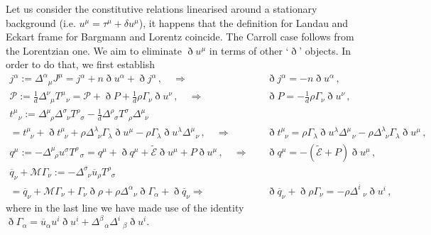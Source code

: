 \documentclass[superscriptaddress,prd,nofootinbib,preprintnumbers,longbibliography,11pt,eqsecnum]{revtex4-1}
\begin{document}
\begin{appendix}
Let us consider the constitutive relations linearised around a stationary background (i.e. $u^{\mu}=\tau^{\mu}+\delta u^{\mu}$), it happens that the definition for Landau and Eckart frame for Bargmann and Lorentz coincide. The Carroll case follows from the Lorentzian one. We aim to eliminate $\eth u^{\mu}$ in terms of other `$\eth$' objects. In order to do that, we first establish
\begin{equation}\begin{aligned}
	j^{\alpha}
	:=
	\Delta^{\alpha}_{\;\;\,\mu}J^{\mu}
	=
	j^{\alpha}
	+
	n\eth u^{\alpha}
	+
	\eth j^{\alpha}
	\,,
	\quad
	\Rightarrow
	&
	\quad
	\eth j^{\alpha}
	=
	-n\eth u^{\alpha}
	\,,
\\
	\mathcal{P}
	:=
	\frac{1}{d}
	\Delta^{\nu}_{\;\;\mu}T^{\mu}_{\;\;\,\nu}
	=
	\mathcal{P}
	+
	\eth P
	+
	\frac{1}{d}\rho \Gamma_{\nu}\eth u^{\nu}
	\,,
	\quad
	\Rightarrow
	&
	\quad
	\eth P
	=
	-\frac{1}{d}\rho \Gamma_{\nu}\eth u^{\nu}
	\,,
\\
	t^{\mu}_{\;\;\,\nu}
	:=
	\Delta^{\mu}_{\;\;\rho}\Delta^{\sigma}_{\;\;\nu}T^{\rho}_{\;\;\sigma}
	-
	\frac{1}{d}\Delta^{\rho}_{\;\;\sigma}T^{\sigma}_{\;\;\rho}\Delta^{\mu}_{\;\;\nu}
	\qquad\qquad\qquad\quad\;\;\;
	&
	\\
	=
	t^{\mu}_{\;\;\nu}
	+
	\eth t^{\mu}_{\;\;\nu}
	+
	\rho \Delta^{\lambda}_{\;\;\nu}\Gamma_{\lambda}\eth u^{\mu}
	-
	\rho \Gamma_{\lambda}\eth u^{\lambda}\Delta^{\mu}_{\;\;\,\nu}
	\,,
	\quad
	\Rightarrow
	&
	\quad
	\eth t^{\mu}_{\;\;\nu}
	=
	\rho \Gamma_{\lambda}\eth u^{\lambda}\Delta^{\mu}_{\;\;\,\nu}
	-
	\rho \Delta^{\lambda}_{\;\;\nu}\Gamma_{\lambda}\eth u^{\mu}
	\,,
\\
	q^{\mu}
	:=
	-
	\Delta^{\mu}_{\;\;\rho}u^{\sigma}T^{\rho}_{\;\;\,\sigma}
	=
	q^{\mu}
	+
	\eth q^{\mu}
	+
	\tilde{\mathcal{E}}\eth u^{\mu}
	+
	P \eth u^{\mu}	
	\,,
	\quad
	\Rightarrow
	&
	\quad
	\eth q^{\mu}
	=
	-
	(
	\tilde{\mathcal{E}}
	+
	P) \eth u^{\mu}	
	\,,
\\
	\overline{q}_{\nu}
	+
	\mathcal{M}
	\Gamma_{\nu}
	:=
	-\Delta^{\sigma}_{\;\;\nu}\overline{u}_{\rho}T^{\rho}_{\;\;\sigma}\,\qquad\qquad\qquad\qquad\qquad\qquad&
	\\
	=
	\overline{q}_{\nu}
	+
	\mathcal{M}
	\Gamma_{\nu}
	+
	\Gamma_{\nu}
	\eth \rho
	+
	\rho \Delta^{\alpha}_{\;\;\,\nu}
	\eth\Gamma_{\alpha}
	+
	\eth \overline{q}_{\nu}
		\Rightarrow&
	\quad
	\eth \overline{q}_{\nu}
	+
	\eth \rho
	\Gamma_{\nu}
	=
	-
	\rho
	\Delta^{i}_{\;\;\,\nu}\eth u^{i}
	\,,
\end{aligned}\end{equation}
where in the last line we have made use of the identity $\eth \Gamma_{\alpha}= \overline{u}_{\alpha}u^{i}\eth u^{i}+\Delta^{\beta}_{\;\;\,\alpha}\Delta^{i}_{\;\;\,\beta}\eth u^{i}$. 


\end{appendix}
\end{document}
